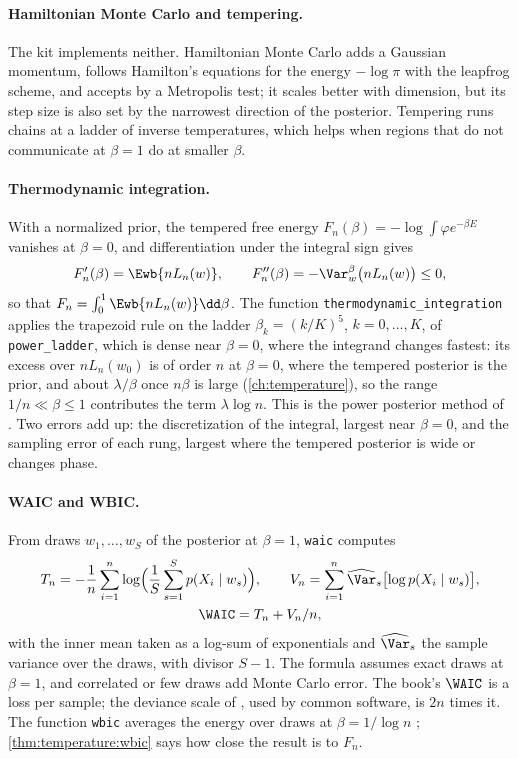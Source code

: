 \begin{refsection}
\paragraph{Hamiltonian Monte Carlo and tempering.} The kit implements neither. Hamiltonian Monte Carlo \parencite{Neal2011} adds a Gaussian momentum, follows Hamilton's equations for the energy $-\log\pi$ with the leapfrog scheme, and accepts by a Metropolis test; it scales better with dimension, but its step size is also set by the narrowest direction of the posterior. Tempering runs chains at a ladder of inverse temperatures, which helps when regions that do not communicate at $\beta=1$ do at smaller $\beta$.

\paragraph{Thermodynamic integration.} With a normalized prior, the tempered free energy $F_n(\beta)=-\log\int\varphi e^{-\beta E}$ vanishes at $\beta=0$, and differentiation under the integral sign gives
\[
F_n'(\beta)=\Ewb{nL_n(w)},\qquad F_n''(\beta)=-\Var^\beta_w\bigl(nL_n(w)\bigr)\le0,
\]
so that $F_n=\int_0^1\Ewb{nL_n(w)}\dd\beta$. The function \texttt{thermodynamic\_\allowbreak integration} applies the trapezoid rule on the ladder $\beta_k=(k/K)^5$, $k=0,\dots,K$, of \texttt{power\_\allowbreak ladder}, which is dense near $\beta=0$, where the integrand changes fastest: its excess over $nL_n(w_0)$ is of order $n$ at $\beta=0$, where the tempered posterior is the prior, and about $\lambda/\beta$ once $n\beta$ is large (\cref{ch:temperature}), so the range $1/n\ll\beta\le1$ contributes the term $\lambda\log n$. This is the power posterior method of \textcite{FrielPettitt2008}. Two errors add up: the discretization of the integral, largest near $\beta=0$, and the sampling error of each rung, largest where the tempered posterior is wide or changes phase.

\paragraph{WAIC and WBIC.} From draws $w_1,\dots,w_S$ of the posterior at $\beta=1$, \texttt{waic} computes
\begin{gather*}
T_n=-\frac1n\sum_{i=1}^n\log\Bigl(\frac1S\sum_{s=1}^Sp(X_i\mid w_s)\Bigr),\qquad V_n=\sum_{i=1}^n\widehat\Var_s\bigl[\log p(X_i\mid w_s)\bigr],\\
\WAIC=T_n+V_n/n,
\end{gather*}
with the inner mean taken as a log-sum of exponentials and $\widehat\Var_s$ the sample variance over the draws, with divisor $S-1$. The formula assumes exact draws at $\beta=1$, and correlated or few draws add Monte Carlo error. The book's $\WAIC$ is a loss per sample; the deviance scale of \textcite{GelmanHwangVehtari2014}, used by common software, is $2n$ times it. The function \texttt{wbic} averages the energy over draws at $\beta=1/\log n$ \parencite{Watanabe2013}; \cref{thm:temperature:wbic} says how close the result is to $F_n$.


\end{refsection}
